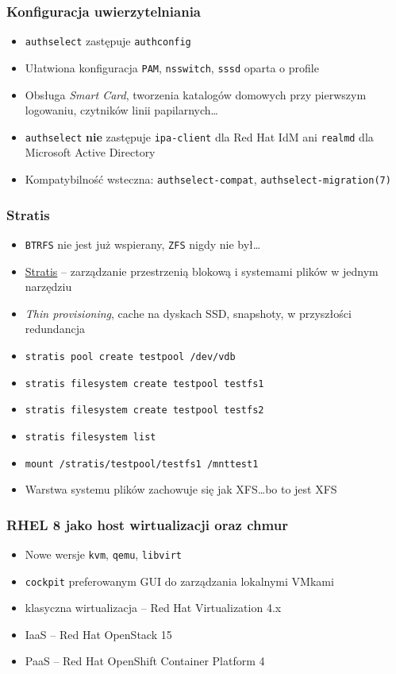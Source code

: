 \documentclass[dvipsnames,table]{beamer}
\begin{document}
\begin{frame}
	\frametitle{Konfiguracja uwierzytelniania}
	\begin{itemize}
		\item {\tt authselect} zastępuje {\tt authconfig}
		\item Ułatwiona konfiguracja {\tt PAM}, {\tt nsswitch}, {\tt sssd} oparta o profile
		\item Obsługa {\em Smart Card}, tworzenia katalogów domowych przy pierwszym logowaniu, czytników linii papilarnych\ldots
		\item {\tt authselect} {\bf nie} zastępuje {\tt ipa-client} dla Red Hat IdM ani {\tt realmd} dla Microsoft Active Directory
		\item Kompatybilność wsteczna: {\tt authselect-compat}, {\tt authselect-migration(7)}
	\end{itemize}
\end{frame}

\begin{frame}
	\frametitle{Stratis}
\begin{itemize}
	\item {\tt BTRFS} nie jest już wspierany, {\tt ZFS} nigdy nie był\ldots
	\item \href{https://stratis-storage.github.io/}{Stratis} -- zarządzanie przestrzenią blokową i systemami plików w jednym narzędziu
	\item {\em Thin provisioning}, cache na dyskach SSD, snapshoty, w przyszłości redundancja
	\item {\tt stratis pool create testpool /dev/vdb} 
	\item {\tt stratis filesystem create testpool testfs1}
	\item {\tt stratis filesystem create testpool testfs2}
	\item {\tt stratis filesystem list}
	\item {\tt mount /stratis/testpool/testfs1 /mnttest1}
	\item Warstwa systemu plików zachowuje się jak XFS\ldots bo to jest XFS
\end{itemize}	
\end{frame}

\begin{frame}
	\frametitle{RHEL 8 jako host wirtualizacji oraz chmur}
\begin{itemize}
	\item Nowe wersje {\tt kvm}, {\tt qemu}, {\tt libvirt}
	\item {\tt cockpit} preferowanym GUI do zarządzania lokalnymi VMkami
	\item klasyczna wirtualizacja -- Red Hat Virtualization 4.x
	\item IaaS -- Red Hat OpenStack 15
	\item PaaS -- Red Hat OpenShift Container Platform 4
\end{itemize}
\end{frame}
\end{document}
